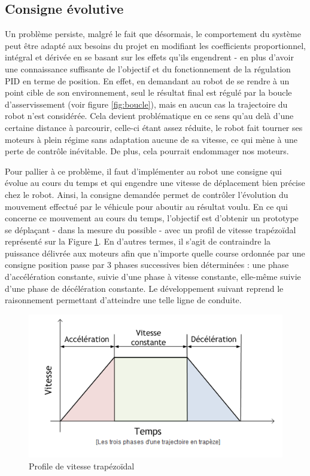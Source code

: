 \documentclass[a4paper,11pt]{article}
\begin{document}
\subsection{Consigne évolutive}

Un problème persiste, malgré le fait que désormais, le comportement du système peut être adapté aux besoins du projet en modifiant les coefficients proportionnel, intégral et dérivée en se basant sur les effets qu'ils engendrent - en plus d'avoir une connaissance suffisante de l'objectif et du fonctionnement de la régulation PID en terme de position. En effet, en demandant au robot de se rendre à un point cible de son environnement, seul le résultat final est régulé par la boucle d'asservissement (voir figure \ref{fig:boucle}), mais en aucun cas la trajectoire du robot n'est considérée. Cela devient problématique en ce sens qu'au delà d'une certaine distance à parcourir, celle-ci étant assez réduite, le robot fait tourner ses moteurs à plein régime sans adaptation aucune de sa vitesse, ce qui mène à une perte de contrôle inévitable. De plus, cela pourrait endommager nos moteurs.

Pour pallier à ce problème, il faut d'implémenter au robot une consigne qui évolue au cours du temps et qui engendre une vitesse de déplacement bien précise chez le robot. Ainsi, la consigne demandée permet de contrôler l'évolution du mouvement effectué par le véhicule pour aboutir au résultat voulu. En ce qui concerne ce mouvement au cours du temps, l'objectif est d'obtenir un prototype se déplaçant - dans la mesure du possible - avec un profil de vitesse trapézoïdal représenté sur la Figure \ref{fig:trapèze}. En d'autres termes, il s'agit de contraindre la puissance délivrée aux moteurs afin que n'importe quelle course ordonnée par une consigne position passe par 3 phases successives bien déterminées : une phase d'accélération constante, suivie d'une phase à vitesse constante, elle-même suivie d'une phase de décélération constante. Le développement suivant reprend le raisonnement permettant d'atteindre une telle ligne de conduite.\\
\begin{figure}[H]
    \centering
    \includegraphics[scale = 1]{Profile_trapeze.png}
    \caption{Profile de vitesse trapézoïdal\cite{noauthor_construction_nodate}}
    \label{fig:trapèze}
\end{figure}
\end{document}
